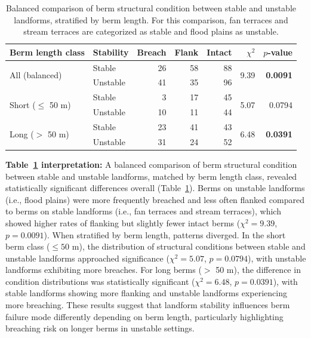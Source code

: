 \documentclass[review]{elsarticle}
\begin{document}
\begin{table}[h!]
\centering
\caption{\normalsize Balanced comparison of berm structural condition between stable and unstable landforms, stratified by berm length. For this comparison, fan terraces and stream terraces are categorized as stable and flood plains as unstable.}
\small
\begin{tabular}{|l|l|r|r|r|r|r|}
\hline
\textbf{Berm length class} & \textbf{Stability} & \textbf{Breach} & \textbf{Flank} & \textbf{Intact} & \textbf{$\chi^2$} & \textbf{$p$-value} \\
\hline
\multirow{2}{*}{All (balanced)} & Stable & 26 & 58 & 88 & \multirow{2}{*}{9.39} & \multirow{2}{*}{\textbf{0.0091}} \\
& Unstable & 41 & 35 & 96 & & \\
\hline
\multirow{2}{*}{Short ($\leq$ 50 m)} & Stable & 3 & 17 & 45 & \multirow{2}{*}{5.07} & \multirow{2}{*}{0.0794} \\
& Unstable & 10 & 11 & 44 & & \\
\hline
\multirow{2}{*}{Long ($>$ 50 m)} & Stable & 23 & 41 & 43 & \multirow{2}{*}{6.48} & \multirow{2}{*}{\textbf{0.0391}} \\
& Unstable & 31 & 24 & 52 & & \\
\hline
\end{tabular}
\label{tab:stability_length_chi}
\end{table}

\textbf{Table~\ref{tab:stability_length_chi} interpretation:} A balanced comparison of berm structural condition between stable and unstable landforms, matched by berm length class, revealed statistically significant differences overall (Table~\ref{tab:stability_length_chi}). Berms on unstable landforms (i.e., flood plains) were more frequently breached and less often flanked compared to berms on stable landforms (i.e., fan terraces and stream terraces), which showed higher rates of flanking but slightly fewer intact berms ($\chi^2 = 9.39$, $p = 0.0091$). When stratified by berm length, patterns diverged. In the short berm class ($\leq 50$ m), the distribution of structural conditions between stable and unstable landforms approached significance ($\chi^2 = 5.07$, $p = 0.0794$), with unstable landforms exhibiting more breaches. For long berms ($>$ 50 m), the difference in condition distributions was statistically significant ($\chi^2 = 6.48$, $p = 0.0391$), with stable landforms showing more flanking and unstable landforms experiencing more breaching. These results suggest that landform stability influences berm failure mode differently depending on berm length, particularly highlighting breaching risk on longer berms in unstable settings.
\end{document}
